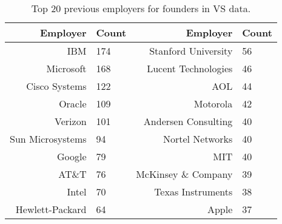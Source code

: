 \begin{table}[]
\centering
\begingroup\normalsize
\begin{tabular}{rlrl}
  \toprule
Employer & Count & Employer & Count \\ 
  \midrule
IBM & 174 & Stanford University & 56 \\ 
  Microsoft & 168 & Lucent Technologies & 46 \\ 
  Cisco Systems & 122 & AOL & 44 \\ 
  Oracle & 109 & Motorola & 42 \\ 
  Verizon & 101 & Andersen Consulting & 40 \\ 
  Sun Microsystems & 94 & Nortel Networks & 40 \\ 
  Google & 79 & MIT & 40 \\ 
  AT\&T & 76 & McKinsey \& Company & 39 \\ 
  Intel & 70 & Texas Instruments & 38 \\ 
  Hewlett-Packard & 64 & Apple & 37 \\ 
   \bottomrule
\end{tabular}
\endgroup
\caption{Top 20 previous employers for founders in VS data.} 
\label{table:VS_previousEmployersNoPositionsSummaryTable}
\end{table}
